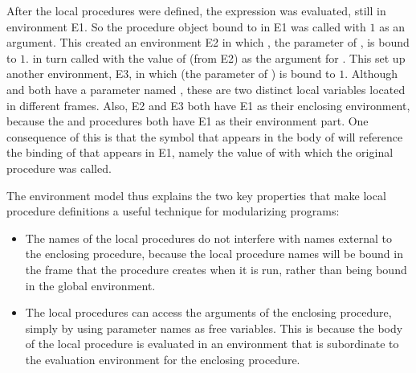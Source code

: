 After the local procedures were defined, the expression  was evaluated, still in environment E1.
So the procedure object bound to  in E1 was called with \( 1 \) as an argument.
This created an environment E2 in which , the parameter of , is bound to \( 1 \).
 in turn called  with the value of  (from E2) as the argument for .
This set up another environment, E3, in which  (the parameter of ) is bound to \( 1 \).
Although  and  both have a parameter named , these are two distinct local variables located in different frames.
Also, E2 and E3 both have E1 as their enclosing environment, because the  and  procedures both have E1 as their environment part.
One consequence of this is that the symbol  that appears in the body of  will reference the binding of  that appears in E1, namely the value of  with which the original  procedure was called.

The environment model thus explains the two key properties that make local procedure definitions a useful technique for modularizing programs:
\begin{itemize}

	\item
		The names of the local procedures do not interfere with names external to the enclosing procedure, because the local procedure names will be bound in the frame that the procedure creates when it is run, rather than being bound in the global environment.

	\item
		The local procedures can access the arguments of the enclosing procedure, simply by using parameter names as free variables.
		This is because the body of the local procedure is evaluated in an environment that is subordinate to the evaluation environment for the enclosing procedure.

\end{itemize}



